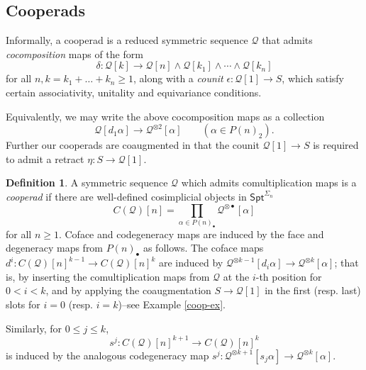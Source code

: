\documentclass[12pt]{amsart}
\theoremstyle{definition}
\newtheorem{definition}[subsection]{Definition}
\theoremstyle{remark}
\newcommand{\Spt}{\mathsf{Spt}}
\newcommand{\Cal}[1]{\mathcal{#1}}
\begin{document}
\subsection{Cooperads} 
Informally, a cooperad is a reduced symmetric sequence $\Cal{Q}$ that admits \textit{cocomposition} maps of the form \[ \delta \colon \Cal{Q}[k]\to \Cal{Q}[n] \wedge \Cal{Q}[k_1] \wedge \cdots \wedge \Cal{Q}[k_n] \] for all $n,k=k_1+\dots+ k_n\geq 1$, along with a \textit{counit} $\epsilon \colon \Cal{Q}[1]\to S$, which satisfy certain associativity, unitality and equivariance conditions. 

Equivalently, we may write the above cocomposition maps as a collection \[\Cal{Q}[d_1\alpha] \to \Cal{Q}^{\otimes 2}[\alpha] \quad \quad (\alpha\in P(n)_2).\] Further our cooperads are coaugmented in that the counit $\Cal{Q}[1]\to S$ is required to admit a retract $\eta\colon S\to \Cal{Q}[1]$. 

\begin{definition} A symmetric sequence $\Cal{Q}$ which admits comultiplication maps is a \textit{cooperad} if there are well-defined cosimplicial objects in $\Spt^{\Sigma_n}$ \[ C(\Cal{Q})[n] = {\prod}_{\alpha\in P(n)_{\bullet}}\Cal{Q}^{\otimes \bullet} [\alpha]\]
for all $n\geq 1$. Coface and codegeneracy maps are induced by the face and degeneracy maps from $P(n)_{\bullet}$ as follows. The coface maps $d^i\colon C(\Cal{Q})[n]^{k-1}\to C(\Cal{Q})[n]^{k}$ are induced by $\Cal{Q}^{\otimes k-1}[d_i \alpha]\to \Cal{Q}^{\otimes k}[\alpha]$; that is, by inserting the comultiplication maps from $\Cal{Q}$ at the $i$-th position for $0< i<k$, and by applying the coaugmentation $S\to \Cal{Q}[1]$ in the first (resp. last) slots for $i=0$ (resp. $i=k$)--see Example \ref{coop-ex}. 

Similarly, for $0\leq j \leq k$, \[s^j\colon C(\Cal{Q})[n]^{k+1}\to C(\Cal{Q})[n]^{k}\] is induced by the analogous codegeneracy map $s^j \colon \Cal{Q}^{\otimes k+1} [s_j \alpha] \to \Cal{Q}^{\otimes k} [\alpha].$
\end{definition}
\end{document}
